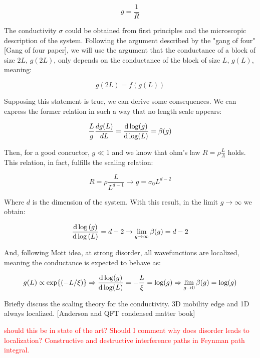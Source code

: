 \begin{equation}
    g=\frac{1}{R}
\end{equation}

The conductivity $\sigma$ could be obtained from first principles and the microscopic description of the system. Following the argument described by the "gang of four" [Gang of four paper], we will use the argument that the conductance of a block of size $2L$, $g(2L)$, only depends on the conductance of the block of size $L$, $g(L)$, meaning: 

\begin{equation}
    g(2L)=f(g(L))
\end{equation}

Supposing this statement is true, we can derive some consequences. We can express the former relation in such a way that no length scale appears:

\begin{equation}
    \frac{L}{g}\frac{dg(L)}{dL}=\dv{\log(g)}{\log(L)}=\beta (g)
\end{equation}

Then, for a good concuctor, $g\ll 1$ and we know that ohm's law $R=\rho \frac{L}{A}$ holds. This relation, in fact, fulfills the scaling relation:

\begin{equation}
    R=\rho \frac{L}{L^{d-1}}\to g = \sigma_0 L^{d-2}
\end{equation}

Where $d$ is the dimension of the system. With this result, in the limit $g\to \infty$ we obtain:

\begin{equation}
    \dv{\log{(g)}}{\log{(L)}}=d-2\to \lim_{g\to \infty} \beta(g)=d-2
\end{equation}

And, following Mott idea, at strong disorder, all wavefunctions are localized, meaning the conductance is expected to behave as:

\begin{equation}
    g(L)\propto \exp{(-L/\xi)}\Rightarrow \dv{\log(g)}{\log(L)}=-\frac{L}{\xi}=\log(g)\Rightarrow \lim_{g\to 0}\beta(g)=\log(g)
\end{equation}

Briefly discuss the scaling theory for the conductivity. 3D mobility edge and 1D always localized. [Anderson and QFT condensed matter book]

\textcolor{red}{should this be in state of the art?}
\textcolor{red}{Should I comment why does disorder leads to localization? Constructive and destructive interference paths in Feynman path integral.}

